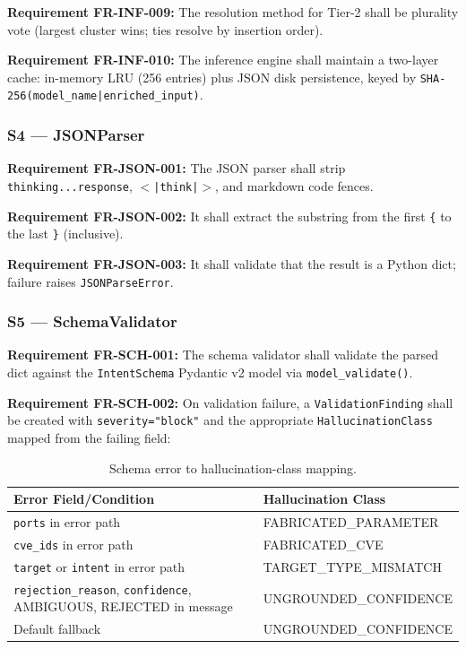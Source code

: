 ﻿\documentclass[10pt,journal,onecolumn]{IEEEtran}
\newcommand{\reqid}[1]{\textbf{#1}}
\begin{document}
\reqid{Requirement FR-INF-009:} The resolution method for Tier-2 shall be plurality vote (largest cluster wins; ties resolve by insertion order).

\reqid{Requirement FR-INF-010:} The inference engine shall maintain a two-layer cache: in-memory LRU (256 entries) plus JSON disk persistence, keyed by \texttt{SHA-256(model\_name|enriched\_input)}.

\subsubsection{S4 --- JSONParser}
\reqid{Requirement FR-JSON-001:} The JSON parser shall strip \texttt{ thinking...response}, \texttt{$<$|think|$>$}, and markdown code fences.

\reqid{Requirement FR-JSON-002:} It shall extract the substring from the first \texttt{\{} to the last \texttt{\}} (inclusive).

\reqid{Requirement FR-JSON-003:} It shall validate that the result is a Python dict; failure raises \texttt{JSONParseError}.

\subsubsection{S5 --- SchemaValidator}
\reqid{Requirement FR-SCH-001:} The schema validator shall validate the parsed dict against the \texttt{IntentSchema} Pydantic v2 model via \texttt{model\_validate()}.

\reqid{Requirement FR-SCH-002:} On validation failure, a \texttt{ValidationFinding} shall be created with \texttt{severity="block"} and the appropriate \texttt{HallucinationClass} mapped from the failing field:
\begin{table}[t]
\caption{Schema error to hallucination-class mapping.}
\label{tab:schmap}
\begin{tabularx}{\textwidth}{>{\ttfamily}l >{\ttfamily}X}
\toprule
\textbf{Error Field/Condition} & \textbf{Hallucination Class}\\
\midrule
\texttt{ports} in error path & FABRICATED\_PARAMETER\\
\texttt{cve\_ids} in error path & FABRICATED\_CVE\\
\texttt{target} or \texttt{intent} in error path & TARGET\_TYPE\_MISMATCH\\
\texttt{rejection\_reason}, \texttt{confidence}, AMBIGUOUS, REJECTED in message & UNGROUNDED\_CONFIDENCE\\
Default fallback & UNGROUNDED\_CONFIDENCE\\
\bottomrule
\end{tabularx}
\end{table}
\end{document}
